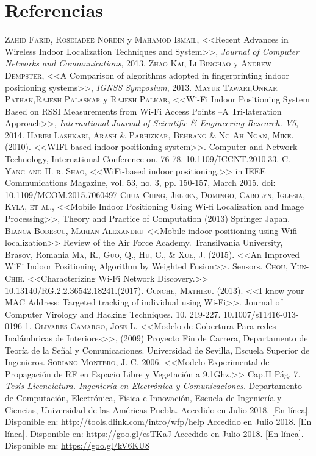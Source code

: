 \chapter{Referencias}

\begin{thebibliography}{X}
 \textsc{Zahid Farid, Rosdiadee Nordin} y \textsc{Mahamod Ismail}, <<Recent Advances in Wireless Indoor Localization Techniques and System>>, \textit{Journal of Computer Networks and Communications}, 2013.
 \textsc{Zhao Kai, Li Binghao} y \textsc{Andrew Dempster}, <<A Comparison of algorithms adopted in fingerprinting indoor positioning systems>>, \textit{IGNSS Symposium}, 2013.
 \textsc{Mayur Tawari},\textsc{Onkar Pathak},\textsc{Rajesh Palaskar} y \textsc{Rajesh Palkar}, <<Wi-Fi Indoor Positioning System Based on RSSI Measurements from Wi-Fi Access Points –A Tri-lateration Approach>>, \textit{International Journal of Scientific \& Engineering Research. V5}, 2014.
 \textsc{Habibi Lashkari, Arash \& Parhizkar, Behrang \& Ng Ah Ngan, Mike.} (2010). <<WIFI-based indoor positioning system>>. Computer and Network Technology, International Conference on. 76-78. 10.1109/ICCNT.2010.33. 
 \textsc{C. Yang and H. r. Shao}, <<WiFi-based indoor positioning,>> in IEEE Communications Magazine, vol. 53, no. 3, pp. 150-157, March 2015. doi: 10.1109/MCOM.2015.7060497
 \textsc{Chua Ching, Jeleen, Domingo, Carolyn, Iglesia, Kyla, et al.}, <<Mobile Indoor Positioning Using Wi-fi Localization and Image Processing>>, Theory and Practice of Computation (2013) Springer Japan.
 \textsc{Bianca Bobescu, Marian Alexandru} <<Mobile indoor positioning using Wifi localization>> Review of the Air Force Academy. Transilvania University, Brasov, Romania
 \textsc{Ma, R., Guo, Q., Hu, C., \& Xue, J.} (2015). <<An Improved WiFi Indoor Positioning Algorithm by Weighted Fusion>>. Sensors.
 \textsc{Chou, Yun-Chih.} <<Characterizing Wi-Fi Network Discovery.>> 10.13140/RG.2.2.36542.18241.(2017).
 \textsc{Cunche, Mathieu.} (2013). <<I know your MAC Address: Targeted tracking of individual using Wi-Fi>>. Journal of Computer Virology and Hacking Techniques. 10. 219-227. 10.1007/s11416-013-0196-1. 
\textsc{Olivares Camargo, Jose L.} <<Modelo de Cobertura Para redes Inalámbricas de Interiores>>, (2009) Proyecto Fin de Carrera, Departamento de Teoría de la Señal y Comunicaciones. Universidad de Sevilla, Escuela Superior de Ingenieros.\label{pdf:1}
 \textsc{Soriano Montero, J. C.} 2006. <<Modelo Experimental de Propagación de RF en Espacio Libre y Vegetación a 9.1Ghz.>> Cap.II Pág. 7. \textit{Tesis Licenciatura. Ingeniería en Electrónica y Comunicaciones.} Departamento de Computación, Electrónica, Física e Innovación, Escuela de Ingeniería y Ciencias, Universidad de las Américas Puebla. \label{pdf:modprop}
 Accedido en Julio 2018. [En línea]. Disponible en: \url{http://tools.dlink.com/intro/wfp/help} \label{fig:prop}
 Accedido en Julio 2018. [En línea]. Disponible en: \url{https://goo.gl/esTKaJ} \label{fig:paginaHP}
 Accedido en Julio 2018. [En línea]. Disponible en: \url{https://goo.gl/kV6KU8}
\end{thebibliography}
